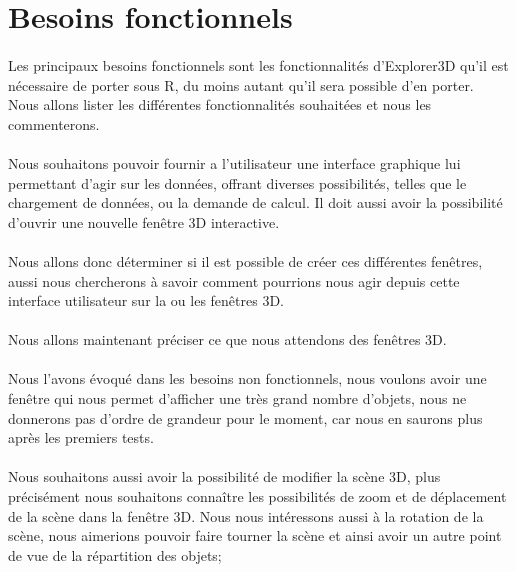 \section{Besoins fonctionnels}
\paragraph{} 
Les principaux besoins fonctionnels sont les fonctionnalités d'Explorer3D qu'il est nécessaire de porter sous R, du moins autant qu'il sera possible d'en porter.\\
Nous allons lister les différentes fonctionnalités souhaitées et nous les commenterons.

\paragraph{} 
Nous souhaitons pouvoir fournir a l'utilisateur une interface graphique lui permettant d'agir sur les données, offrant diverses possibilités, telles que le chargement de données, ou la demande de calcul. Il doit aussi avoir la possibilité d'ouvrir une nouvelle fenêtre 3D interactive.

\paragraph{}
 Nous allons donc déterminer si il est possible de créer ces différentes fenêtres, aussi nous chercherons à savoir comment pourrions nous agir depuis cette interface utilisateur sur la ou les fenêtres 3D.

\paragraph{} 
Nous allons maintenant préciser ce que nous attendons des fenêtres 3D.

\paragraph{} 
Nous l'avons évoqué dans les besoins non fonctionnels, nous voulons avoir une fenêtre qui nous permet d'afficher une très grand nombre d'objets, nous ne donnerons pas d'ordre de grandeur pour le moment, car nous en saurons plus après les premiers tests.

\paragraph{}
Nous souhaitons aussi avoir la possibilité de modifier la scène 3D, plus précisément nous souhaitons connaître les possibilités de zoom et de déplacement de la scène dans la fenêtre 3D. Nous nous intéressons aussi à la rotation de la scène, nous aimerions pouvoir faire tourner la scène et ainsi avoir un autre point de vue de la répartition des objets;

